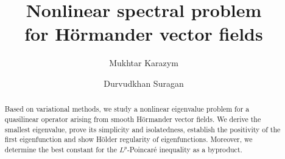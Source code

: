 \documentclass[a4paper,12pt,reqno]{amsart}
\numberwithin{equation}{section}
\theoremstyle{plain}
\theoremstyle{definition}
\begin{document}
   \title[Nonlinear spectral problem  for H\"ormander vector fields]
   {Nonlinear spectral problem \\ for H\"ormander vector fields}

\author[M. Karazym]{Mukhtar Karazym}
\address{
  Mukhtar Karazym:
  \endgraf
  Department of Mathematics
  \endgraf
Nazarbayev University, Kazakhstan
  \endgraf
  {\it E-mail address} {\rm mukhtarkarazym@gmail.com; mukhtar.karazym@nu.edu.kz}
  }

 \author[D. Suragan]{Durvudkhan Suragan}
\address{
	Durvudkhan Suragan:
	\endgraf
	Department of Mathematics
	\endgraf
Nazarbayev University, Kazakhstan
	\endgraf
	{\it E-mail address} {\rm durvudkhan.suragan@nu.edu.kz}
} 




\begin{abstract} 
Based on variational methods, we study a nonlinear eigenvalue problem for a quasilinear operator arising from smooth H\"ormander vector fields. We derive the smallest eigenvalue, prove its simplicity and  isolatedness, establish  the positivity of the first eigenfunction and show  H\"older regularity of eigenfunctions.  Moreover, we determine the best constant for the $L^{p}$-Poincar\'e inequality as a byproduct.
\end{abstract}
\maketitle

\end{document}
